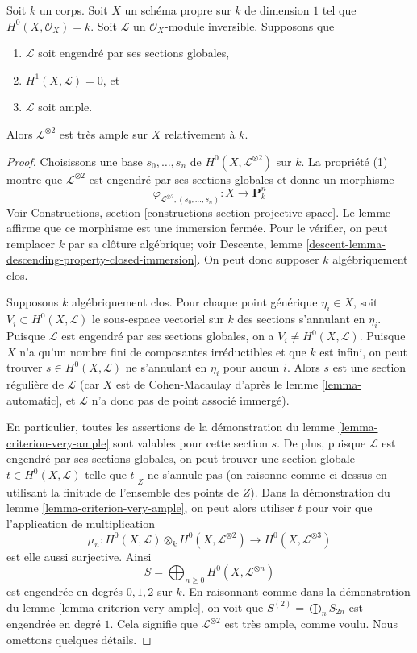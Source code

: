 \begin{lemma}
\label{lemma-criterion-very-ample-bis}
Soit $k$ un corps. Soit $X$ un schéma propre sur $k$ de dimension $1$ tel que $H^0(X, \mathcal{O}_X) = k$. Soit $\mathcal{L}$ un $\mathcal{O}_X$-module inversible. Supposons que \begin{enumerate} \item $\mathcal{L}$ soit engendré par ses sections globales, \item $H^1(X, \mathcal{L}) = 0$, et \item $\mathcal{L}$ soit ample. \end{enumerate} Alors $\mathcal{L}^{\otimes 2}$ est très ample sur $X$ relativement à $k$.
\end{lemma}

\begin{proof}
Choisissons une base $s_0, \ldots, s_n$ de $H^0(X, \mathcal{L}^{\otimes 2})$ sur $k$. La propriété (1) montre que $\mathcal{L}^{\otimes 2}$ est engendré par ses sections globales et donne un morphisme $$
\varphi_{\mathcal{L}^{\otimes 2}, (s_0, \ldots, s_n)} :
X \longrightarrow \mathbf{P}^n_k
$$ Voir Constructions, section \ref{constructions-section-projective-space}. Le lemme affirme que ce morphisme est une immersion fermée. Pour le vérifier, on peut remplacer $k$ par sa clôture algébrique; voir Descente, lemme \ref{descent-lemma-descending-property-closed-immersion}. On peut donc supposer $k$ algébriquement clos.

\medskip\noindent
Supposons $k$ algébriquement clos. Pour chaque point générique $\eta_i \in X$, soit $V_i \subset H^0(X, \mathcal{L})$ le sous-espace vectoriel sur $k$ des sections s'annulant en $\eta_i$. Puisque $\mathcal{L}$ est engendré par ses sections globales, on a $V_i \not = H^0(X, \mathcal{L})$. Puisque $X$ n'a qu'un nombre fini de composantes irréductibles et que $k$ est infini, on peut trouver $s \in H^0(X, \mathcal{L})$ ne s'annulant en $\eta_i$ pour aucun $i$. Alors $s$ est une section régulière de $\mathcal{L}$ (car $X$ est de Cohen-Macaulay d'après le lemme \ref{lemma-automatic}, et $\mathcal{L}$ n'a donc pas de point associé immergé).

\medskip\noindent
En particulier, toutes les assertions de la démonstration du lemme \ref{lemma-criterion-very-ample} sont valables pour cette section $s$. De plus, puisque $\mathcal{L}$ est engendré par ses sections globales, on peut trouver une section globale $t \in H^0(X, \mathcal{L})$ telle que $t|_Z$ ne s'annule pas (on raisonne comme ci-dessus en utilisant la finitude de l'ensemble des points de $Z$). Dans la démonstration du lemme \ref{lemma-criterion-very-ample}, on peut alors utiliser $t$ pour voir que l'application de multiplication $$
\mu_n :
H^0(X, \mathcal{L}) \otimes_k H^0(X, \mathcal{L}^{\otimes 2})
\longrightarrow
H^0(X, \mathcal{L}^{\otimes 3})
$$ est elle aussi surjective. Ainsi $$
S = \bigoplus\nolimits_{n \geq 0} H^0(X, \mathcal{L}^{\otimes n})
$$ est engendrée en degrés $0, 1, 2$ sur $k$. En raisonnant comme dans la démonstration du lemme \ref{lemma-criterion-very-ample}, on voit que $S^{(2)} = \bigoplus_{n} S_{2n}$ est engendrée en degré $1$. Cela signifie que $\mathcal{L}^{\otimes 2}$ est très ample, comme voulu. Nous omettons quelques détails.
\end{proof}
